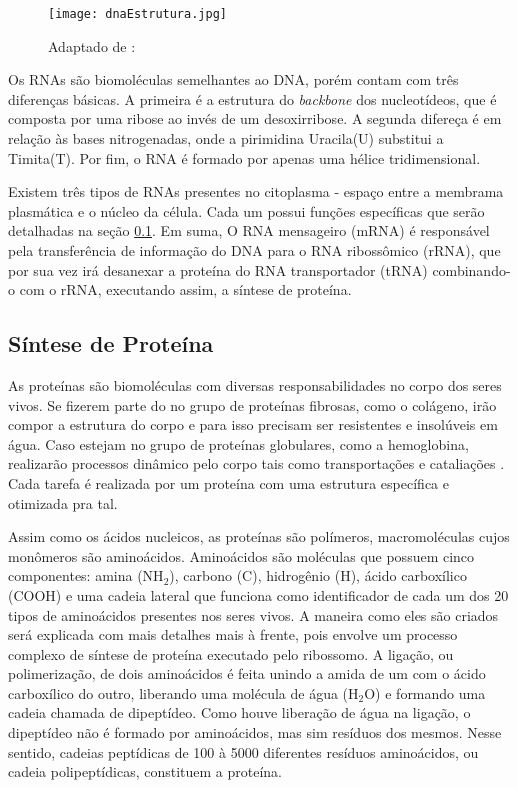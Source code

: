 \begin{figure}[h]
    \centering
    \texttt{[image: dnaEstrutura.jpg]}
    \caption{Adaptado de : \cite{dnadiscovery08} }
    \label{fig:EstruturasDoDNA}
\end{figure} 

\indent Os RNAs são biomoléculas semelhantes ao DNA, porém contam com três diferenças básicas. A primeira é a estrutura do \textit{backbone} dos nucleotídeos, que é composta por uma ribose ao invés de um desoxirribose. A segunda difereça é em relação às bases nitrogenadas, onde a pirimidina Uracila(U) substitui a Timita(T). Por fim, o RNA é formado por apenas uma hélice tridimensional.

\indent Existem três tipos de RNAs presentes no citoplasma - espaço entre a membrama plasmática e o núcleo da célula. 
Cada um possui funções específicas que serão detalhadas na seção \ref{sinteseDeProteina}. Em suma, O RNA mensageiro (mRNA) é responsável pela transferência de informação do DNA para o RNA ribossômico (rRNA), que por sua vez irá desanexar a proteína do RNA transportador (tRNA) combinando-o com o rRNA, executando assim, a síntese de proteína.




\subsection{Síntese de Proteína} \label{sinteseDeProteina}

\indent As proteínas são biomoléculas com diversas responsabilidades no corpo dos seres vivos. Se fizerem parte do no grupo de proteínas fibrosas, como o colágeno, irão compor a estrutura do corpo e para isso precisam ser resistentes e insolúveis em água. Caso estejam no grupo de proteínas globulares, como a hemoglobina, realizarão processos dinâmico pelo corpo tais como transportações e cataliações \cite{profangela11}.  Cada tarefa é realizada por um proteína com uma estrutura específica e otimizada pra tal.

\indent Assim como os ácidos nucleicos, as proteínas são polímeros, macromoléculas cujos monômeros são aminoácidos. Aminoácidos são moléculas que possuem cinco componentes: amina (NH$_{2}$), carbono (C), hidrogênio (H), ácido carboxílico (COOH) e uma cadeia lateral que funciona como identificador de cada um dos 20 tipos de aminoácidos presentes nos seres vivos. A maneira como eles são criados será explicada com mais detalhes mais à frente, pois envolve um processo complexo de síntese de proteína executado pelo ribossomo. A ligação, ou polimerização, de dois aminoácidos é feita unindo a amida de um com o ácido carboxílico do outro, liberando uma molécula de água (H$_{2}$O) e formando uma cadeia chamada de dipeptídeo. Como houve liberação de água na ligação, o dipeptídeo não é formado por aminoácidos, mas sim resíduos dos mesmos. Nesse sentido, cadeias peptídicas de 100 à 5000 diferentes resíduos aminoácidos, ou cadeia polipeptídicas,  constituem a proteína.

